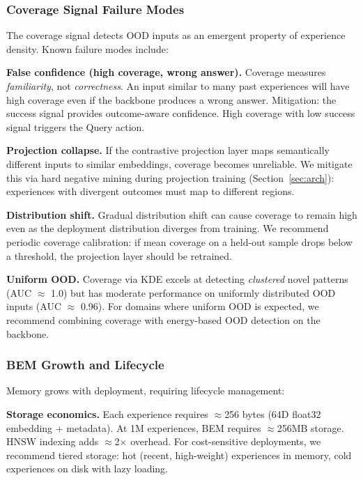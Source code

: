 \documentclass[twoside,11pt]{article}
\begin{document}
\subsubsection{Coverage Signal Failure Modes}

The coverage signal detects OOD inputs as an emergent property of experience density. Known failure modes include:

\textbf{False confidence (high coverage, wrong answer).} Coverage measures \emph{familiarity}, not \emph{correctness}. An input similar to many past experiences will have high coverage even if the backbone produces a wrong answer. Mitigation: the success signal provides outcome-aware confidence. High coverage with low success signal triggers the Query action.

\textbf{Projection collapse.} If the contrastive projection layer maps semantically different inputs to similar embeddings, coverage becomes unreliable. We mitigate this via hard negative mining during projection training (Section~\ref{sec:arch}): experiences with divergent outcomes must map to different regions.

\textbf{Distribution shift.} Gradual distribution shift can cause coverage to remain high even as the deployment distribution diverges from training. We recommend periodic coverage calibration: if mean coverage on a held-out sample drops below a threshold, the projection layer should be retrained.

\textbf{Uniform OOD.} Coverage via KDE excels at detecting \emph{clustered} novel patterns (AUC $\approx$ 1.0) but has moderate performance on uniformly distributed OOD inputs (AUC $\approx$ 0.96). For domains where uniform OOD is expected, we recommend combining coverage with energy-based OOD detection on the backbone.

\subsubsection{BEM Growth and Lifecycle}

Memory grows with deployment, requiring lifecycle management:

\textbf{Storage economics.} Each experience requires $\approx$256 bytes (64D float32 embedding + metadata). At 1M experiences, BEM requires $\approx$256MB storage. HNSW indexing adds $\approx$2$\times$ overhead. For cost-sensitive deployments, we recommend tiered storage: hot (recent, high-weight) experiences in memory, cold experiences on disk with lazy loading.
\end{document}
